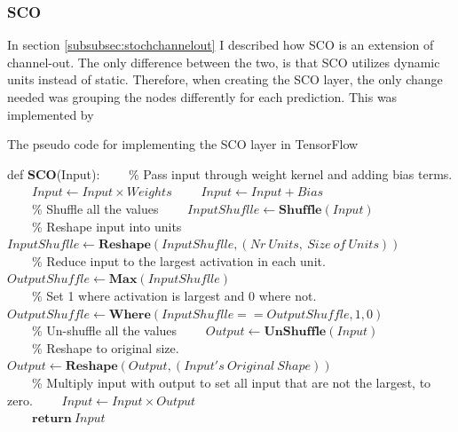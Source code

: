 \subsubsection*{\ac{SCO}}
In section \ref{subsubsec:stochchannelout} I described how \ac{SCO} is an extension of channel-out. The only difference
between the two, is that \ac{SCO} utilizes dynamic units instead of static. Therefore, when creating the \ac{SCO} layer,
the only change needed was grouping the nodes differently for each prediction. This was implemented by 
\begin{algorithm}
    \caption{The pseudo code for implementing the SCO layer in TensorFlow}\label{alg:SCO}
    \begin{algorithmic}[1]
    \State def \textbf{SCO}(Input): 
    \State \ \ \ \ $\%$ Pass input through weight kernel and adding bias terms.
    \State \ \ \ \ $Input \gets Input \times Weights$
    \State \ \ \ \ $Input \gets Input + Bias$
    \\
    \State \ \ \ \ $\%$ Shuffle all the values
    \State \ \ \ \ $InputShuflle \gets \textbf{Shuffle}(Input)$
    \\
    \State \ \ \ \ $\%$ Reshape input into units
    \State \ \ \ \ $InputShuflle \gets \textbf{Reshape}(InputShuflle,(Nr\ Units,\ Size \ of \ Units))$
    \\
    \State \ \ \ \ $\%$ Reduce input to the largest activation in each unit.
    \State \ \ \ \ $OutputShuffle \gets \textbf{Max}(InputShuflle)$
    \\
    \State \ \ \ \ $\%$ Set 1 where activation is largest and 0 where not.
    \State \ \ \ \ $OutputShuffle \gets \textbf{Where}(InputShuflle == OutputShuffle, 1,0)$
    \\
    \State \ \ \ \ $\%$ Un-shuffle all the values
    \State \ \ \ \ $Output \gets \textbf{UnShuffle}(Input)$
    \\
    \State \ \ \ \ $\%$ Reshape to original size.
    \State \ \ \ \ $Output \gets \textbf{Reshape}(Output,(Input's \ Original \ Shape))$
    \\
    \State \ \ \ \ $\%$ Multiply input with output to set all input that are not the largest, to zero.
    \State \ \ \ \ $Input \gets Input \times Output$
    \\
    \State \ \ \ \ $\textbf{return}\ Input$
    \end{algorithmic}
\end{algorithm}
